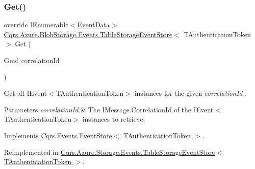 \mbox{\label{classCqrs_1_1Azure_1_1BlobStorage_1_1Events_1_1TableStorageEventStore_a9b952a9257dc6f458b98eba87684412e_a9b952a9257dc6f458b98eba87684412e}} 
\subsubsection{\texorpdfstring{Get()}{Get()}\hspace{0.1cm}{\footnotesize\ttfamily [2/2]}}
{\footnotesize\ttfamily override I\+Enumerable$<$\hyperlink{classCqrs_1_1Events_1_1EventData}{Event\+Data}$>$ \hyperlink{classCqrs_1_1Azure_1_1BlobStorage_1_1Events_1_1TableStorageEventStore}{Cqrs.\+Azure.\+Blob\+Storage.\+Events.\+Table\+Storage\+Event\+Store}$<$ T\+Authentication\+Token $>$.Get (\begin{DoxyParamCaption}\item[{Guid}]{correlation\+Id }\end{DoxyParamCaption})\hspace{0.3cm}{\ttfamily [virtual]}}



Get all I\+Event$<$\+T\+Authentication\+Token$>$ instances for the given {\itshape correlation\+Id} . 


\begin{DoxyParams}{Parameters}
{\em correlation\+Id} & The I\+Message.\+Correlation\+Id of the I\+Event$<$\+T\+Authentication\+Token$>$ instances to retrieve.\\
\hline
\end{DoxyParams}


Implements \hyperlink{classCqrs_1_1Events_1_1EventStore_a0096646f5dff730b0041b9469719c420_a0096646f5dff730b0041b9469719c420}{Cqrs.\+Events.\+Event\+Store$<$ T\+Authentication\+Token $>$}.



Reimplemented in \hyperlink{classCqrs_1_1Azure_1_1Storage_1_1Events_1_1TableStorageEventStore_a1b436bbb111b14b85ee6ba7f90fb1a35_a1b436bbb111b14b85ee6ba7f90fb1a35}{Cqrs.\+Azure.\+Storage.\+Events.\+Table\+Storage\+Event\+Store$<$ T\+Authentication\+Token $>$}.

